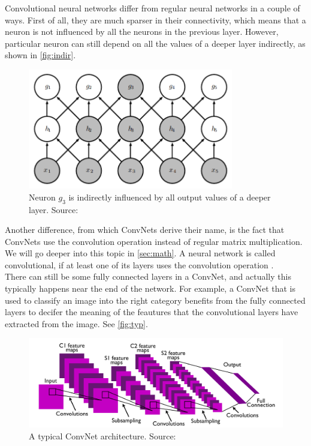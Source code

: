 Convolutional neural networks differ from regular neural networks in a couple of ways. First of all, they are much sparser in their connectivity, which means that a neuron is not influenced by all the neurons in the previous layer. However, particular neuron can still depend on all the values of a deeper layer indirectly, as shown in \autoref{fig:indir}.\\

\begin{figure}
    \centering
    \includegraphics[width=0.8\textwidth]{images/indir.png}
    \caption{Neuron $g_3$ is indirectly influenced by all output values of a deeper layer. Source: \cite{dl-book}}
    \label{fig:indir}
\end{figure}

Another difference, from which ConvNets derive their name, is the fact that ConvNets use the convolution operation instead of regular matrix multiplication. We will go deeper into this topic in \autoref{sec:math}. A neural network is called convolutional, if at least one of its layers uses the convolution operation \cite[Ch. 9]{dl-book}.\\

There can still be some fully connected layers in a ConvNet, and actually this typically happens near the end of the network. For example, a ConvNet that is used to classify an image into the right category benefits from the fully connected layers to decifer the meaning of the feautures that the convolutional layers have extracted from the image. See \autoref{fig:typ}.

\begin{figure}
    \centering
    \includegraphics[width=\textwidth]{images/typicalConvNet.png}
    \caption{A typical ConvNet architecture. Source: \cite{convnet}}
    \label{fig:typ}
\end{figure}






